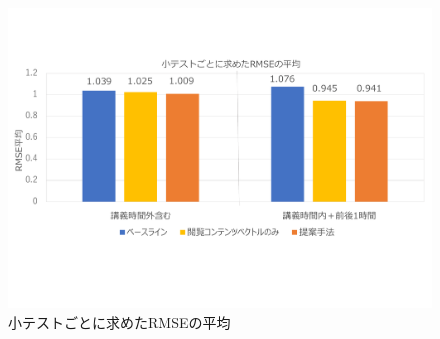 \documentclass[a4paper,twocolumn,11pt]{jarticle}
\begin{document}
\begin{figure}[tbp]
  \centering
  \includegraphics[width=0.9\linewidth]{RMSE_5s.pdf}
  \vspace{-16mm}
  \caption{小テストごとに求めたRMSEの平均}
  \label{fig:rmse_2}
  \vspace{-2mm}
\end{figure}



\fontsize{9pt}{9pt}\selectfont


\end{document}
